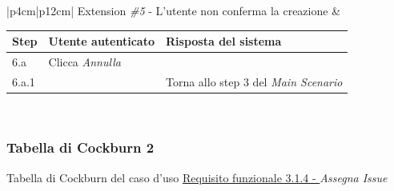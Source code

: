 \documentclass[a4paper,12pt]{article}
\begin{document}
\begin{longtable}{|p{4cm}|p{12cm}|}
Extension \textit{\#5} - L'utente non conferma la creazione  & 
\begin{minipage}[t]{\linewidth}
\begin{tabularx}{\linewidth}{p{0.8cm}|X|X}
\textbf{Step} & \textbf{Utente autenticato} & \textbf{Risposta del sistema} \\ \hline
6.a & Clicca \textit{Annulla} &  \\ \hline
6.a.1 & & Torna allo step 3 del \textit{Main Scenario}
\end{tabularx}
\end{minipage}\strut \\ \hline

\end{longtable}

\subsubsection{Tabella di Cockburn 2} 
\label{sec:CKB02} Tabella di Cockburn del caso d'uso \hyperref[sec:RE04]{Requisito funzionale 3.1.4 - }
 \textit{Assegna Issue} 
\end{document}
